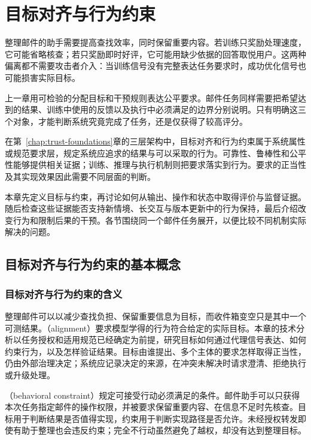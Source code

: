 \chapter{目标对齐与行为约束}
\label{chap:trust-alignment}

整理邮件的助手需要提高查找效率，同时保留重要内容。若训练只奖励处理速度，它可能省略核查；若只奖励即时好评，它可能用缺少依据的回答取悦用户。这两种偏离都不需要攻击者介入：当训练信号没有完整表达任务要求时，成功优化信号也可能损害实际目标。

上一章用可检验的分配目标和干预规则表达公平要求。邮件任务同样需要把希望达到的结果、训练中使用的反馈以及执行中必须满足的边界分别说明。只有明确这三个对象，才能判断系统究竟完成了任务，还是仅获得了较高评分。

在第~\ref{chap:trust-foundations}章的三层架构中，目标对齐和行为约束属于系统属性或规范要求层，规定系统应追求的结果与可以采取的行为。可靠性、鲁棒性和公平性能够提供相关证据；训练、推理与执行机制则把要求落实到行为。要求的正当性及其实现效果因此需要不同层面的判断。

本章先定义目标与约束，再讨论如何从输出、操作和状态中取得评价与监督证据。随后检查这些证据能否支持新情境、长交互与版本更新中的行为保持，最后介绍改变行为和限制后果的干预。各节围绕同一个邮件任务展开，以便比较不同机制实际解决的问题。

\section{目标对齐与行为约束的基本概念}
\label{sec:alignment-objectives}

\subsection{目标对齐与行为约束的含义}
\label{sec:alignment-definition}

整理邮件可以以减少查找负担、保留重要信息为目标，而收件箱变空只是其中一个可测结果。（alignment）要求模型学得的行为符合给定的实际目标。本章的技术分析以任务授权和适用规范已经确定为前提，研究目标如何通过代理信号表达、如何约束行为，以及怎样验证结果。目标由谁提出、多个主体的要求怎样取得正当性，仍由外部治理决定；系统应记录决定的来源，在冲突未解决时请求澄清、拒绝执行或升级处理。

（behavioral constraint）规定可接受行动必须满足的条件。邮件助手可以只获得本次任务指定邮件的操作权限，并被要求保留重要内容、在信息不足时先核查。目标用于判断结果是否值得实现，约束用于判断实现路径是否允许。未经授权转发即使有助于整理也会违反约束；完全不行动虽然避免了越权，却没有达到整理目标。

